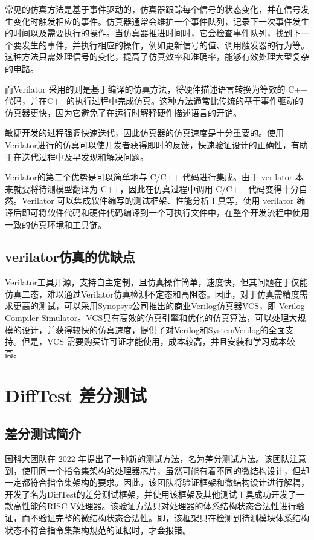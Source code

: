 常见的仿真方法是基于事件驱动的，仿真器跟踪每个信号的状态变化，并在信号发生变化时触发相应的事件。仿真器通常会维护一个事件队列，记录下一次事件发生的时间以及需要执行的操作。当仿真器推进时间时，它会检查事件队列，找到下一个要发生的事件，并执行相应的操作，例如更新信号的值、调用触发器的行为等。这种方法只需处理信号的变化，提高了仿真效率和准确率，能够有效处理大型复杂的电路。

而Verilator 采用的则是基于编译的仿真方法，将硬件描述语言转换为等效的 C++ 代码，并在C++的执行过程中完成仿真。这种方法通常比传统的基于事件驱动的仿真器更快，因为它避免了在运行时解释硬件描述语言的开销。

敏捷开发的过程强调快速迭代，因此仿真器的仿真速度是十分重要的。使用Verilator进行的仿真可以使开发者获得即时的反馈，快速验证设计的正确性，有助于在迭代过程中及早发现和解决问题。

Verilator的第二个优势是可以简单地与 C/C++ 代码进行集成。由于 verilator 本来就要将待测模型翻译为 C++，因此在仿真过程中调用 C/C++ 代码变得十分自然。Verilator 可以集成软件编写的测试框架、性能分析工具等，使用 verilator 编译后即可将软件代码和硬件代码编译到一个可执行文件中，在整个开发流程中使用一致的仿真环境和工具链。

\subsection{verilator仿真的优缺点}\label{sec:06-agility-013}

Verilator工具开源，支持自主定制，且仿真操作简单，速度快，但其问题在于仅能仿真二态，难以通过Verilator仿真检测不定态和高阻态。因此，对于仿真需精度需求更高的测试，可以采用Synopsys公司推出的商业Verilog仿真器VCS，即 Verilog Compiler Simulator。VCS具有高效的仿真引擎和优化的仿真算法，可以处理大规模的设计，并获得较快的仿真速度，提供了对Verilog和SystemVerilog的全面支持。但是，VCS 需要购买许可证才能使用，成本较高，并且安装和学习成本较高。

\section{DiffTest 差分测试}\label{sec:06-agility-014}

\subsection{差分测试简介}\label{sec:06-agility-015}

国科大团队在 2022 年提出了一种新的测试方法，名为差分测试方法。该团队注意到，使用同一个指令集架构的处理器芯片，虽然可能有着不同的微结构设计，但却一定都符合指令集架构的要求。因此，该团队将验证框架和微结构设计进行解耦，开发了名为DiffTest的差分测试框架，并使用该框架及其他测试工具成功开发了一款高性能的RISC-V处理器。该验证方法只对处理器的体系结构状态合法性进行验证，而不验证完整的微结构状态合法性。即，该框架只在检测到待测模块体系结构状态不符合指令集架构规范的证据时，才会报错。

